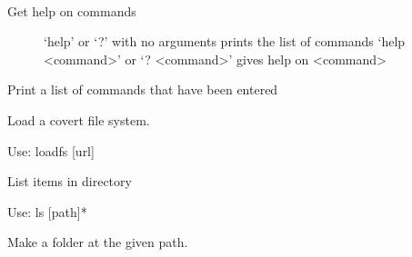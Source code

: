 \documentclass[letterpaper,12pt,openany,oneside]{sphinxmanual}
\begin{document}
\begin{fulllineitems}
\begin{fulllineitems}
\end{fulllineitems}


\begin{fulllineitems}
\label{main:main.Console.do_help}~\begin{description}
\item[{Get help on commands}] \leavevmode
`help' or `?' with no arguments prints the list of commands
`help \textless{}command\textgreater{}' or `? \textless{}command\textgreater{}' gives help on \textless{}command\textgreater{}

\end{description}

\end{fulllineitems}


\begin{fulllineitems}
\label{main:main.Console.do_hist}
Print a list of commands that have been entered

\end{fulllineitems}


\begin{fulllineitems}
\label{main:main.Console.do_loadfs}
Load a covert file system.

Use: loadfs {[}url{]}

\end{fulllineitems}


\begin{fulllineitems}
\label{main:main.Console.do_ls}
List items in directory

Use: ls {[}path{]}*

\end{fulllineitems}


\begin{fulllineitems}
\label{main:main.Console.do_mkdir}
Make a folder at the given path.


\end{fulllineitems}
\end{fulllineitems}
\end{document}
